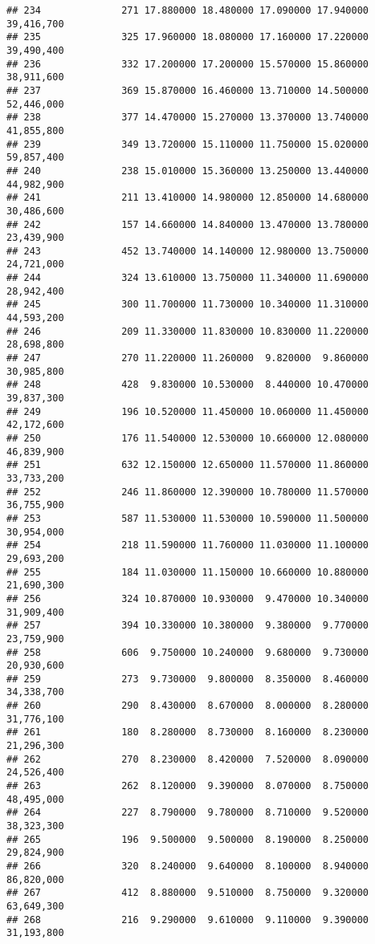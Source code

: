 \documentclass[]{article}
\begin{document}
\begin{verbatim}
## 234              271 17.880000 18.480000 17.090000 17.940000  39,416,700
## 235              325 17.960000 18.080000 17.160000 17.220000  39,490,400
## 236              332 17.200000 17.200000 15.570000 15.860000  38,911,600
## 237              369 15.870000 16.460000 13.710000 14.500000  52,446,000
## 238              377 14.470000 15.270000 13.370000 13.740000  41,855,800
## 239              349 13.720000 15.110000 11.750000 15.020000  59,857,400
## 240              238 15.010000 15.360000 13.250000 13.440000  44,982,900
## 241              211 13.410000 14.980000 12.850000 14.680000  30,486,600
## 242              157 14.660000 14.840000 13.470000 13.780000  23,439,900
## 243              452 13.740000 14.140000 12.980000 13.750000  24,721,000
## 244              324 13.610000 13.750000 11.340000 11.690000  28,942,400
## 245              300 11.700000 11.730000 10.340000 11.310000  44,593,200
## 246              209 11.330000 11.830000 10.830000 11.220000  28,698,800
## 247              270 11.220000 11.260000  9.820000  9.860000  30,985,800
## 248              428  9.830000 10.530000  8.440000 10.470000  39,837,300
## 249              196 10.520000 11.450000 10.060000 11.450000  42,172,600
## 250              176 11.540000 12.530000 10.660000 12.080000  46,839,900
## 251              632 12.150000 12.650000 11.570000 11.860000  33,733,200
## 252              246 11.860000 12.390000 10.780000 11.570000  36,755,900
## 253              587 11.530000 11.530000 10.590000 11.500000  30,954,000
## 254              218 11.590000 11.760000 11.030000 11.100000  29,693,200
## 255              184 11.030000 11.150000 10.660000 10.880000  21,690,300
## 256              324 10.870000 10.930000  9.470000 10.340000  31,909,400
## 257              394 10.330000 10.380000  9.380000  9.770000  23,759,900
## 258              606  9.750000 10.240000  9.680000  9.730000  20,930,600
## 259              273  9.730000  9.800000  8.350000  8.460000  34,338,700
## 260              290  8.430000  8.670000  8.000000  8.280000  31,776,100
## 261              180  8.280000  8.730000  8.160000  8.230000  21,296,300
## 262              270  8.230000  8.420000  7.520000  8.090000  24,526,400
## 263              262  8.120000  9.390000  8.070000  8.750000  48,495,000
## 264              227  8.790000  9.780000  8.710000  9.520000  38,323,300
## 265              196  9.500000  9.500000  8.190000  8.250000  29,824,900
## 266              320  8.240000  9.640000  8.100000  8.940000  86,820,000
## 267              412  8.880000  9.510000  8.750000  9.320000  63,649,300
## 268              216  9.290000  9.610000  9.110000  9.390000  31,193,800

\end{verbatim}
\end{document}
